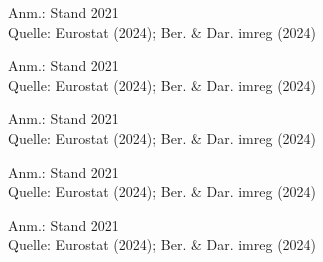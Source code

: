 \begin{figure}[p]
	{\centering {}}
	\label{map:mebesch}
	\begin{spacing}{1} \scriptsize
		Anm.: Stand 2021\\
		Quelle: Eurostat (2024); Ber. \& Dar. imreg (2024) \end{spacing}
\end{figure}


\begin{figure}[p]
	{\centering {}}
	\label{map:meunt}
	\begin{spacing}{1} \scriptsize
		Anm.: Stand 2021\\
		Quelle: Eurostat (2024); Ber. \& Dar. imreg (2024) \end{spacing}
\end{figure}


\begin{figure}[p]
	{\centering {}}
	\label{map:melohn}
	\begin{spacing}{1} \scriptsize
		Anm.: Stand 2021\\
		Quelle: Eurostat (2024); Ber. \& Dar. imreg (2024) \end{spacing}
\end{figure}


\begin{figure}[p]
	{\centering {}}
	\label{map:mebschdichte}
	\begin{spacing}{1} \scriptsize
		Anm.: Stand 2021\\
		Quelle: Eurostat (2024); Ber. \& Dar. imreg (2024) \end{spacing}
\end{figure}


\begin{figure}[p]
	{\centering {}}
	\label{map:mebschdichteew}
	\begin{spacing}{1} \scriptsize
		Anm.: Stand 2021\\
		Quelle: Eurostat (2024); Ber. \& Dar. imreg (2024) \end{spacing}
\end{figure}


